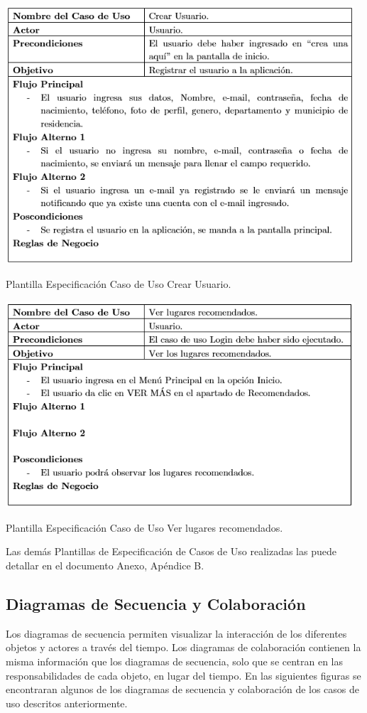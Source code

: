 \documentclass[12pt,letterpaper,openany]{book}
\begin{document}
\begin{table}[H]
\centering
\includegraphics[width=13cm]{./imagenes/PCU/crear_usuario}
\caption{Plantilla Especificación Caso de Uso Crear Usuario.}
\end{table}

\begin{table}[H]
\centering
\includegraphics[width=13cm]{./imagenes/PCU/ver_lugares_recomendados}
\caption{Plantilla Especificación Caso de Uso Ver lugares recomendados.}
\end{table}

Las demás Plantillas de Especificación de Casos de Uso realizadas las puede detallar en el documento Anexo, Apéndice B.

\subsection{Diagramas de Secuencia y Colaboración}
Los diagramas de secuencia permiten visualizar la interacción de los diferentes objetos y actores a través del tiempo. Los diagramas de colaboración contienen la misma información que los diagramas de secuencia, solo que se centran en las responsabilidades de cada objeto, en lugar del tiempo. En las siguientes figuras se encontraran algunos de los diagramas de secuencia y colaboración de los casos de uso descritos anteriormente.
\end{document}
